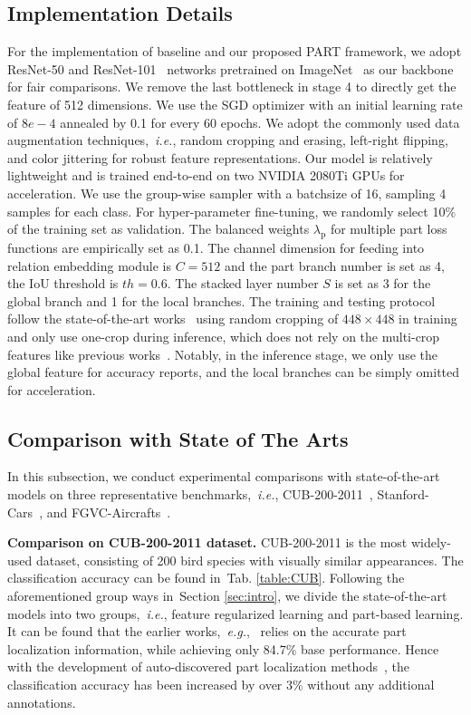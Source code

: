 \documentclass[journal]{IEEEtran}
\def\ie{{\em i.e.}}
\def\eg{{\em e.g.}}
\newcommand{\tabref}[1]{Tab. \ref{#1}}
\newcommand{\secref}[1]{Section \ref{#1}}
\newcommand{\br}[1]{\bm{\mathrm{#1}}}
\begin{document}
\subsection{Implementation Details}\label{sec:expimplementaion}
For the implementation of baseline and our proposed PART framework, we adopt ResNet-50 and ResNet-101~\cite{he2016deep} networks pretrained on ImageNet~\cite{deng2009imagenet} as our backbone for fair comparisons. We remove the last bottleneck in stage 4 to directly get the feature of 512 dimensions. We use the SGD optimizer with an initial learning rate of $8e-4$ annealed by 0.1 for every 60 epochs. We adopt the commonly used data augmentation techniques,~\ie, random cropping and erasing, left-right flipping, and color jittering for robust feature representations. Our model is relatively lightweight and is trained end-to-end on two NVIDIA 2080Ti GPUs for acceleration. We use the group-wise sampler with a batchsize of 16, sampling 4 samples for each class.
For hyper-parameter fine-tuning, we randomly select 10\% of the training set as validation.
The balanced weights $\lambda_{\br{p}}$ for multiple part loss functions are empirically set as 0.1.
The channel dimension for feeding into relation embedding module is $C=512$ and the part branch number is set as 4, the IoU threshold is $th=0.6$. The stacked layer number $S$ is set as 3 for the global branch and 1 for the local branches. The training and testing protocol follow the state-of-the-art works~\cite{luo2019cross,chen2019destruction,zhang2020learning} using random cropping of $448\times448$ in training and only use one-crop during inference, which does not rely on the multi-crop features like previous works~\cite{fu2017look,zheng2017learning,yang2018learning}. Notably, in the inference stage, we only use the global feature for accuracy reports, and the local branches can be simply omitted for acceleration.




\subsection{Comparison with State of The Arts}\label{sec:expcomp}
In this subsection, we conduct experimental comparisons with state-of-the-art models on three representative benchmarks,~\ie, CUB-200-2011~\cite{wah2011caltech}, Stanford-Cars~\cite{krause20133d}, and FGVC-Aircrafts~\cite{maji2013fine}.

\textbf{Comparison on CUB-200-2011 dataset.} CUB-200-2011 is the most widely-used dataset, consisting of 200 bird species with visually similar appearances. The classification accuracy can be found in~\tabref{table:CUB}. Following the aforementioned group ways in~\secref{sec:intro}, we divide the state-of-the-art models into two groups,~\ie, feature regularized learning and part-based learning. It can be found that the earlier works,~\eg,~\cite{krause2015fine,liu2016fully} relies on the accurate part localization information, while achieving only 84.7\% base performance. Hence with the development of auto-discovered part localization methods~\cite{zheng2017learning,yang2018learning}, the classification accuracy has been increased by over 3\% without any additional annotations.
\end{document}
